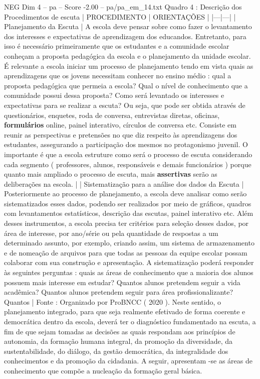 \begin{textsample}{NEG Dim 4 – pa – Score -2.00 – pa/pa\_em\_14.txt}  \label{ex:f4_neg_276}
Quadro 4 : Descrição dos Procedimentos de escuta | PROCEDIMENTO | ORIENTAÇÕES | |---|---| | Planejamento da Escuta | A escola deve pensar sobre como fazer o levantamento dos interesses e expectativas de aprendizagem dos educandos.
Entretanto, para isso é necessário primeiramente que os estudantes e a comunidade escolar conheçam a proposta pedagógica da escola e o planejamento da unidade escolar.
É relevante a escola iniciar um processo de planejamento tendo em vista quais as aprendizagens que os jovens necessitam conhecer no ensino médio : qual a proposta pedagógica que permeia a escola?
Qual o nível de conhecimento que a comunidade possui dessa proposta?
Como será levantado os interesses e expectativas para se realizar a escuta?
Ou seja, que pode ser obtida através de questionários, enquetes, roda de conversa, entrevistas diretas, oficinas, \textbf{formulários} online, painel interativo, círculos de conversa etc.
Consiste em reunir as perspectivas e pretensões no que diz respeito às aprendizagens dos estudantes, assegurando a participação dos mesmos no protagonismo juvenil.
O importante é que a escola estruture como será o processo de escuta considerando cada segmento ( professores, alunos, responsáveis e demais funcionários ) porque quanto mais ampliado o processo de escuta, mais \textbf{assertivas} serão as deliberações na escola. | | Sistematização para a análise dos dados da Escuta | Posteriormente ao processo de planejamento, a escola deve analisar como serão sistematizados esses dados, podendo ser realizados por meio de gráficos, quadros com levantamentos estatísticos, descrição das escutas, painel interativo etc.
Além desses instrumentos, a escola precisa ter critérios para seleção desses dados, por área de interesse, por ano/série ou pela quantidade de respostas a um determinado assunto, por exemplo, criando assim, um sistema de armazenamento e de nomeação de arquivos para que todas as pessoas da equipe escolar possam colaborar com sua construção e apresentação.
A sistematização poderá responder às seguintes perguntas : quais as áreas de conhecimento que a maioria dos alunos possuem mais interesse em estudar?
Quantos alunos pretendem seguir a vida acadêmica?
Quantos alunos pretendem seguir para área profissionalizante?
Quantos | Fonte : Organizado por ProBNCC ( 2020 ).
Neste sentido, o planejamento integrado, para que seja realmente efetivado de forma coerente e democrática dentro da escola, deverá ter o diagnóstico fundamentado na escuta, a fim de que sejam tomadas as decisões as quais respondam aos princípios de autonomia, da formação humana integral, da promoção da diversidade, da sustentabilidade, do diálogo, da gestão democrática, da integralidade dos conhecimentos e da promoção da cidadania.
A seguir, apresentam -se as áreas de conhecimento que compõe a nucleação da formação geral básica.

\end{textsample}

